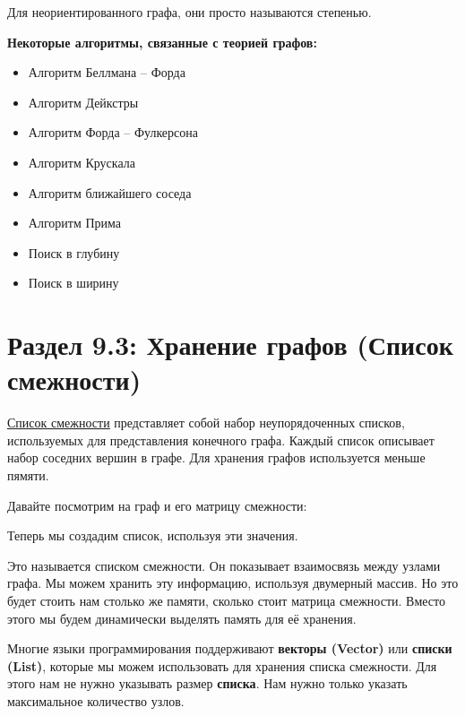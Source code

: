Для неориентированного графа, они просто называются степенью.

\begin{center}
\end{center}

\textbf{Некоторые алгоритмы, связанные с теорией графов:}
\begin{itemize}
    \item Алгоритм Беллмана – Форда
    \item Алгоритм Дейкстры
    \item Алгоритм Форда – Фулкерсона
    \item Алгоритм Крускала
    \item Алгоритм ближайшего соседа
    \item Алгоритм Прима
    \item Поиск в глубину
    \item Поиск в ширину
\end{itemize}

\section*{Раздел 9.3: Хранение графов (Список смежности)}

\href{https://en.wikipedia.org/wiki/Adjacency_list}{\underline{Список смежности}} представляет собой набор неупорядоченных списков, используемых для представления конечного графа. Каждый список описывает набор соседних вершин в графе. Для хранения графов используется меньше пямяти.

\vspace{\baselineskip}

Давайте посмотрим на граф и его матрицу смежности:


Теперь мы создадим список, используя эти значения.


Это называется списком смежности. Он показывает взаимосвязь между узлами графа. Мы можем хранить эту информацию, используя двумерный массив. Но это будет стоить нам столько же памяти, сколько стоит матрица смежности. Вместо этого мы будем динамически выделять память для её хранения.

\vspace{\baselineskip}

Многие языки программирования поддерживают \textbf{векторы (Vector)} или \textbf{списки (List)}, которые мы можем использовать для хранения списка смежности. Для этого нам не нужно указывать размер \textbf{списка}. Нам нужно только указать максимальное количество узлов.

